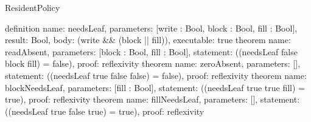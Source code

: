 \begin{lexlean}{ResidentPolicy}
\begin{semanticmodule}
definition{
  name: needsLeaf, parameters: [write : Bool, block : Bool, fill : Bool], result: Bool,
  body: (write && (block || fill)), executable: true
}
theorem{ name: readAbsent, parameters: [block : Bool, fill : Bool], statement: ((needsLeaf false block fill) = false), proof: reflexivity{} }
theorem{ name: zeroAbsent, parameters: [], statement: ((needsLeaf true false false) = false), proof: reflexivity{} }
theorem{ name: blockNeedsLeaf, parameters: [fill : Bool], statement: ((needsLeaf true true fill) = true), proof: reflexivity{} }
theorem{ name: fillNeedsLeaf, parameters: [], statement: ((needsLeaf true false true) = true), proof: reflexivity{} }
\end{semanticmodule}
\end{lexlean}
